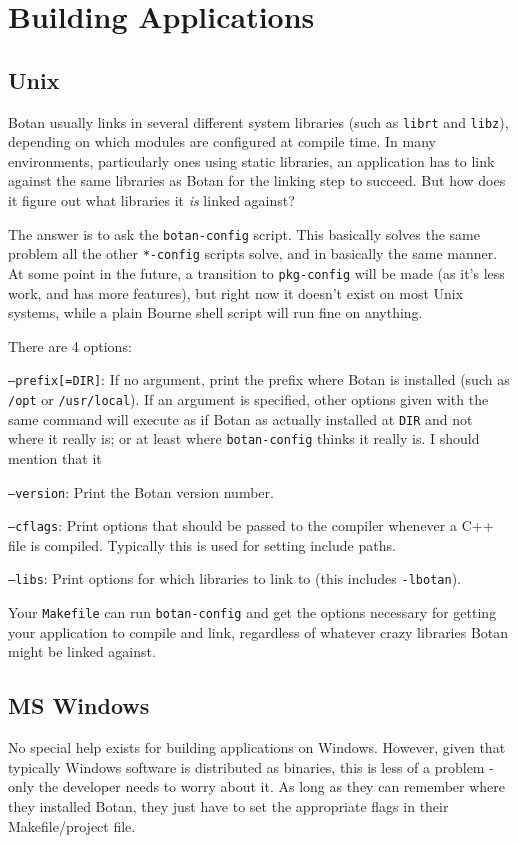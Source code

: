 \documentclass{article}
\newcommand{\filename}[1]{\texttt{#1}}
\begin{document}
\pagebreak

\section{Building Applications}

\subsection{Unix}

Botan usually links in several different system libraries (such as
\texttt{librt} and \texttt{libz}), depending on which modules are configured at
compile time. In many environments, particularly ones using static libraries,
an application has to link against the same libraries as Botan for the linking
step to succeed. But how does it figure out what libraries it \emph{is} linked
against?

The answer is to ask the \filename{botan-config} script. This basically solves
the same problem all the other \filename{*-config} scripts solve, and in
basically the same manner. At some point in the future, a transition to
\filename{pkg-config} will be made (as it's less work, and has more features),
but right now it doesn't exist on most Unix systems, while a plain Bourne shell
script will run fine on anything.

There are 4 options:

\texttt{--prefix[=DIR]}: If no argument, print the prefix where Botan is
installed (such as \filename{/opt} or \filename{/usr/local}). If an argument is
specified, other options given with the same command will execute as if Botan
as actually installed at \filename{DIR} and not where it really is; or at least
where \filename{botan-config} thinks it really is. I should mention that it

\texttt{--version}: Print the Botan version number.

\texttt{--cflags}: Print options that should be passed to the compiler whenever
a C++ file is compiled. Typically this is used for setting include paths.

\texttt{--libs}: Print options for which libraries to link to (this includes
\texttt{-lbotan}).

Your \filename{Makefile} can run \filename{botan-config} and get the options
necessary for getting your application to compile and link, regardless of
whatever crazy libraries Botan might be linked against.

\subsection{MS Windows}

No special help exists for building applications on Windows. However, given
that typically Windows software is distributed as binaries, this is less of a
problem - only the developer needs to worry about it. As long as they can
remember where they installed Botan, they just have to set the appropriate
flags in their Makefile/project file.
\end{document}
